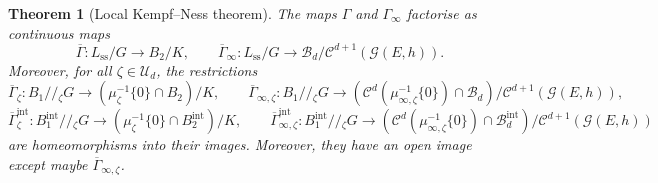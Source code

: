 \documentclass{article}
\newtheorem{theorem}{Theorem}[section]
\theoremstyle{remark}
\theoremstyle{definition}
\newcommand{\G}{\mathcal{G}}
\newcommand{\mB}{\mathcal{B}}
\newcommand{\mC}{\mathcal{C}}
\newcommand{\mU}{\mathcal{U}}
\begin{document}
\begin{theorem}[Local Kempf--Ness theorem]\label{THE:Kempf--Ness}
    The maps $\Gamma$ and $\Gamma_\infty$ factorise as continuous maps
    $$
    \overline{\Gamma} : L_{\mathrm{ss}}/G \longrightarrow B_2/K, \qquad \overline{\Gamma}_\infty : L_{\mathrm{ss}}/G \longrightarrow \mB_d/\mC^{d + 1}(\G(E,h)).
    $$
    Moreover, for all $\zeta \in \mU_d$, the restrictions
    $$
    \overline{\Gamma}_\zeta : B_1/\!/\!_\zeta G \longrightarrow (\mu_\zeta^{-1}\{0\} \cap B_2)/K, \qquad \overline{\Gamma}_{\infty,\zeta} : B_1/\!/\!_\zeta G \longrightarrow (\mC^d(\mu_{\infty,\zeta}^{-1}\{0\}) \cap \mB_d)/\mC^{d + 1}(\G(E,h)),
    $$
    $$
    \overline{\Gamma}_\zeta^{\mathrm{int}} : B_1^{\mathrm{int}}/\!/\!_\zeta G \longrightarrow (\mu_\zeta^{-1}\{0\} \cap B_2^{\mathrm{int}})/K, \qquad \overline{\Gamma}_{\infty,\zeta}^{\mathrm{int}} : B_1^{\mathrm{int}}/\!/\!_\zeta G \longrightarrow (\mC^d(\mu_{\infty,\zeta}^{-1}\{0\}) \cap \mB_d^{\mathrm{int}})/\mC^{d + 1}(\G(E,h))
    $$
    are homeomorphisms into their images. Moreover, they have an open image except maybe $\overline{\Gamma}_{\infty,\zeta}$.
\end{theorem}
\end{document}
